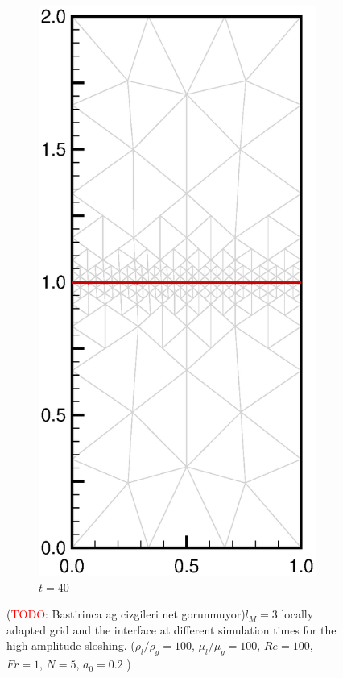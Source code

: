 \documentclass[11pt,a4paper,twoside]{article}
\begin{document}
\begin{figure}[ht!]
\begin{center}
\begin{subfigure}[]{0.2\textwidth}
				\includegraphics[width=\textwidth]{SW_N5_L3_7.eps}
				\caption{$t =40$}
			\end{subfigure}
		\end{center}
		\caption{(\textcolor{red}{TODO}: Bastirinca ag cizgileri net gorunmuyor)$ l_M = 3 $ locally adapted grid and the interface at different simulation times for the high amplitude sloshing. ($ \rho_l/\rho_g  = 100$, $ \mu_l/\mu_g  = 100$,  $ Re = 100 $,  $ Fr = 1 $, $ N=5 $, $ a_0 = 0.2 $ )}
		\label{Fig:StandingWave_N5_a2}
	\end{figure}
	
\end{document}

